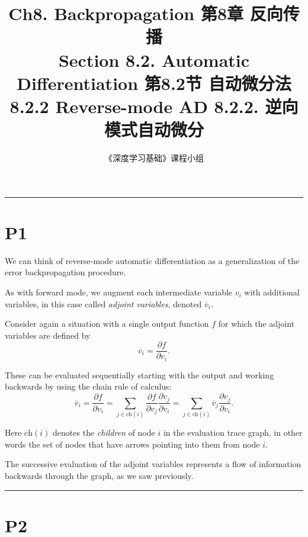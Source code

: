 \documentclass{article}
\title{Ch8. Backpropagation \hfill 第8章 反向传播 \\ 
Section 8.2. Automatic Differentiation \hfill 第8.2节 自动微分法 \\ 
8.2.2 Reverse-mode AD \hfill 8.2.2. 逆向模式自动微分}
\author{《深度学习基础》课程小组}
\begin{document}
\maketitle

\setlength{\parindent}{0pt} %
\setlength{\parskip}{1.5em} %

\noindent\rule{\linewidth}{0.4pt}

\section{P1}

We can think of reverse-mode automatic differentiation as a generalization of the error backpropagation procedure. 

As with forward mode, we augment each intermediate variable $v_i$ with additional variables, in this case called \emph{adjoint variables}, denoted $\overline{v}_i$. 

Consider again a situation with a single output function $f$ for which the adjoint variables are defined by
\begin{equation}
\overline{v}_i = \frac{\partial f}{\partial v_i}.
\tag{8.68}
\end{equation}

These can be evaluated sequentially starting with the output and working backwards by using the chain rule of calculus:
\begin{equation}
\overline{v}_i = \frac{\partial f}{\partial v_i}
= \sum_{j \in \mathrm{ch}(i)} \frac{\partial f}{\partial v_j} \frac{\partial v_j}{\partial v_i}
= \sum_{j \in \mathrm{ch}(i)} \overline{v}_j \frac{\partial v_j}{\partial v_i}.
\tag{8.69}
\end{equation}

Here $\mathrm{ch}(i)$ denotes the \emph{children} of node $i$ in the evaluation trace graph, in other words the set of nodes that have arrows pointing into them from node $i$. 

The successive evaluation of the adjoint variables represents a flow of information backwards through the graph, as we saw previously.

\noindent\rule{\linewidth}{0.4pt}

\section{P2}
\end{document}
